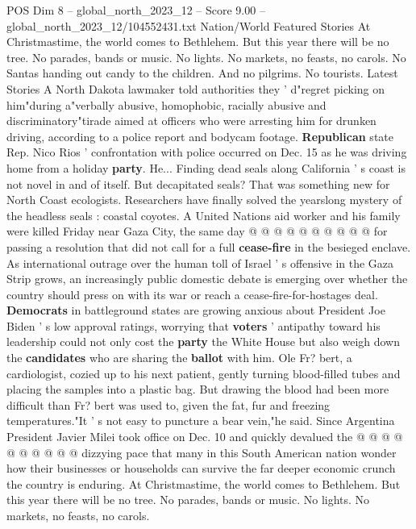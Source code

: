 \begin{textsample}{POS Dim 8 – global\_north\_2023\_12 – Score 9.00 – global\_north\_2023\_12/104552431.txt}  \label{ex:f8_pos_116}
Nation/World Featured Stories At Christmastime, the world comes to Bethlehem.
But this year there will be no tree.
No parades, bands or music.
No lights.
No markets, no feasts, no carols.
No Santas handing out candy to the children.
And no pilgrims.
No tourists.
Latest Stories A North Dakota lawmaker told authorities they ' d"regret picking on him"during a"verbally abusive, homophobic, racially abusive and discriminatory"tirade aimed at officers who were arresting him for drunken driving, according to a police report and bodycam footage. \textbf{Republican} state Rep.
Nico Rios ' confrontation with police occurred on Dec. 15 as he was driving home from a holiday \textbf{party}.
He...
Finding dead seals along California ' s coast is not novel in and of itself.
But decapitated seals?
That was something new for North Coast ecologists.
Researchers have finally solved the yearslong mystery of the headless seals : coastal coyotes.
A United Nations aid worker and his family were killed Friday near Gaza City, the same day @ @ @ @ @ @ @ @ @ @ for passing a resolution that did not call for a full \textbf{cease-fire} in the besieged enclave.
As international outrage over the human toll of Israel ' s offensive in the Gaza Strip grows, an increasingly public domestic debate is emerging over whether the country should press on with its war or reach a cease-fire-for-hostages deal. \textbf{Democrats} in battleground states are growing anxious about President Joe Biden ' s low approval ratings, worrying that \textbf{voters} ' antipathy toward his leadership could not only cost the \textbf{party} the White House but also weigh down the \textbf{candidates} who are sharing the \textbf{ballot} with him.
Ole Fr? bert, a cardiologist, cozied up to his next patient, gently turning blood-filled tubes and placing the samples into a plastic bag.
But drawing the blood had been more difficult than Fr? bert was used to, given the fat, fur and freezing temperatures."It ' s not easy to puncture a bear vein,"he said.
Since Argentina President Javier Milei took office on Dec. 10 and quickly devalued the @ @ @ @ @ @ @ @ @ @ dizzying pace that many in this South American nation wonder how their businesses or households can survive the far deeper economic crunch the country is enduring.
At Christmastime, the world comes to Bethlehem.
But this year there will be no tree.
No parades, bands or music.
No lights.
No markets, no feasts, no carols.

\end{textsample}
